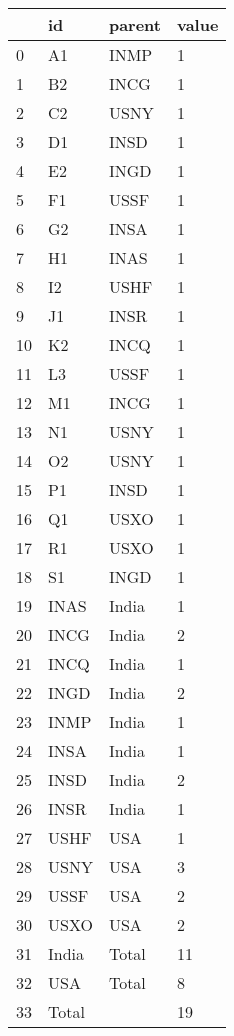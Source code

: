 \documentclass[
  letterpaper,
  DIV=11,
  numbers=noendperiod]{scrartcl}
\begin{document}
\begin{tabular}{llll}
\toprule
{} &     id & parent & value \\
\midrule
0  &     A1 &   INMP &     1 \\
1  &     B2 &   INCG &     1 \\
2  &     C2 &   USNY &     1 \\
3  &     D1 &   INSD &     1 \\
4  &     E2 &   INGD &     1 \\
5  &     F1 &   USSF &     1 \\
6  &     G2 &   INSA &     1 \\
7  &     H1 &   INAS &     1 \\
8  &     I2 &   USHF &     1 \\
9  &     J1 &   INSR &     1 \\
10 &     K2 &   INCQ &     1 \\
11 &     L3 &   USSF &     1 \\
12 &     M1 &   INCG &     1 \\
13 &     N1 &   USNY &     1 \\
14 &     O2 &   USNY &     1 \\
15 &     P1 &   INSD &     1 \\
16 &     Q1 &   USXO &     1 \\
17 &     R1 &   USXO &     1 \\
18 &     S1 &   INGD &     1 \\
19 &   INAS &  India &     1 \\
20 &   INCG &  India &     2 \\
21 &   INCQ &  India &     1 \\
22 &   INGD &  India &     2 \\
23 &   INMP &  India &     1 \\
24 &   INSA &  India &     1 \\
25 &   INSD &  India &     2 \\
26 &   INSR &  India &     1 \\
27 &   USHF &    USA &     1 \\
28 &   USNY &    USA &     3 \\
29 &   USSF &    USA &     2 \\
30 &   USXO &    USA &     2 \\
31 &  India &  Total &    11 \\
32 &    USA &  Total &     8 \\
33 &  Total &        &    19 \\
\bottomrule
\end{tabular}
\end{document}
